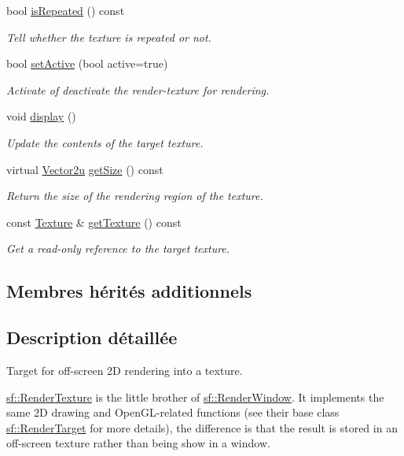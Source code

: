 \begin{DoxyCompactItemize}
bool \hyperlink{classsf_1_1RenderTexture_a81c5a453a21c7e78299b062b97dc8c87}{is\+Repeated} () const
\begin{DoxyCompactList}\small\item\em Tell whether the texture is repeated or not. \end{DoxyCompactList}\item 
bool \hyperlink{classsf_1_1RenderTexture_a5da95ecdbce615a80bb78399012508cf}{set\+Active} (bool active=true)
\begin{DoxyCompactList}\small\item\em Activate of deactivate the render-\/texture for rendering. \end{DoxyCompactList}\item 
void \hyperlink{classsf_1_1RenderTexture_af92886d5faef3916caff9fa9ab32c555}{display} ()
\begin{DoxyCompactList}\small\item\em Update the contents of the target texture. \end{DoxyCompactList}\item 
virtual \hyperlink{classsf_1_1Vector2}{Vector2u} \hyperlink{classsf_1_1RenderTexture_a6685315b5c4c25a5dcb75b4280b381ba}{get\+Size} () const
\begin{DoxyCompactList}\small\item\em Return the size of the rendering region of the texture. \end{DoxyCompactList}\item 
const \hyperlink{classsf_1_1Texture}{Texture} \& \hyperlink{classsf_1_1RenderTexture_a07ecea85f05932fa02a8279416721bc9}{get\+Texture} () const
\begin{DoxyCompactList}\small\item\em Get a read-\/only reference to the target texture. \end{DoxyCompactList}\end{DoxyCompactItemize}
\subsection*{Membres hérités additionnels}


\subsection{Description détaillée}
Target for off-\/screen 2D rendering into a texture. 

\hyperlink{classsf_1_1RenderTexture}{sf\+::\+Render\+Texture} is the little brother of \hyperlink{classsf_1_1RenderWindow}{sf\+::\+Render\+Window}. It implements the same 2D drawing and Open\+G\+L-\/related functions (see their base class \hyperlink{classsf_1_1RenderTarget}{sf\+::\+Render\+Target} for more details), the difference is that the result is stored in an off-\/screen texture rather than being show in a window.

